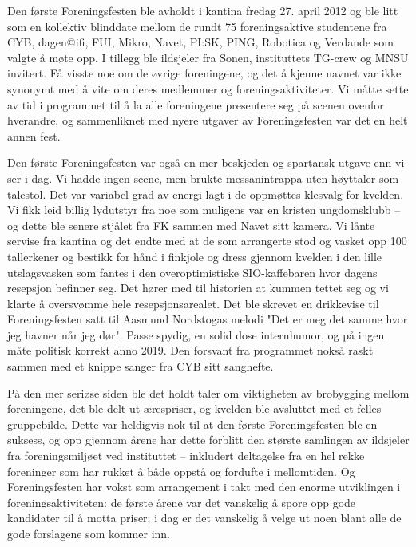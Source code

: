 Den første Foreningsfesten ble avholdt i kantina fredag 27. april 2012 og ble litt som en kollektiv blinddate mellom de rundt 75 foreningsaktive studentene fra CYB, dagen@ifi, FUI, Mikro, Navet, PI:SK, PING, Robotica og Verdande som valgte å møte opp. I tillegg ble ildsjeler fra Sonen, instituttets TG-crew og MNSU invitert. Få visste noe om de øvrige foreningene, og det å kjenne navnet var ikke synonymt med å vite om deres medlemmer og foreningsaktiviteter. Vi måtte sette av tid i programmet til å la alle foreningene presentere seg på scenen ovenfor hverandre, og sammenliknet med nyere utgaver av Foreningsfesten var det en helt annen fest.

Den første Foreningsfesten var også en mer beskjeden og spartansk utgave enn vi ser i dag. Vi hadde ingen scene, men brukte messanintrappa uten høyttaler som talestol. Det var variabel grad av energi lagt i de oppmøttes klesvalg for kvelden. Vi fikk leid billig lydutstyr fra noe som muligens var en kristen ungdomsklubb – og dette ble senere stjålet fra FK sammen med Navet sitt kamera. Vi lånte servise fra kantina og det endte med at de som arrangerte stod og vasket opp 100 tallerkener og bestikk for hånd i finkjole og dress gjennom kvelden i den lille utslagsvasken som fantes i den overoptimistiske SIO-kaffebaren hvor dagens resepsjon befinner seg. Det hører med til historien at kummen tettet seg og vi klarte å oversvømme hele resepsjonsarealet. Det ble skrevet en drikkevise til Foreningsfesten satt til Aasmund Nordstogas melodi "Det er meg det samme hvor jeg havner når jeg dør". Passe spydig, en solid dose internhumor, og på ingen måte politisk korrekt anno 2019. Den forsvant fra programmet nokså raskt sammen med et knippe sanger fra CYB sitt sanghefte.

På den mer seriøse siden ble det holdt taler om viktigheten av brobygging mellom foreningene, det ble delt ut ærespriser, og kvelden ble avsluttet med et felles gruppebilde. Dette var heldigvis nok til at den første Foreningsfesten ble en suksess, og opp gjennom årene har dette forblitt den største samlingen av ildsjeler fra foreningsmiljøet ved instituttet – inkludert deltagelse fra en hel rekke foreninger som har rukket å både oppstå og fordufte i mellomtiden. Og Foreningsfesten har vokst som arrangement i takt med den enorme utviklingen i foreningsaktiviteten: de første årene var det vanskelig å spore opp gode kandidater til å motta priser; i dag er det vanskelig å velge ut noen blant alle de gode forslagene som kommer inn.

